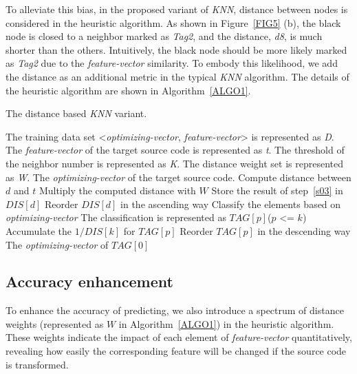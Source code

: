 \documentclass[bst/sn-mathphys]{sn-jnl}%
\theoremstyle{thmstyleone}%
\theoremstyle{thmstyletwo}%
\theoremstyle{thmstylethree}%
\begin{document}
To alleviate this bias, in the proposed variant of \emph{KNN}, distance 
between nodes is considered in the heuristic algorithm. As shown in 
Figure~\ref{FIG5} (b), the black node is closed to a neighbor marked as 
\emph{Tag2}, and the distance, \emph{d8}, is much shorter than the others. 
Intuitively, the black node should be more likely marked as \emph{Tag2} due to 
the \emph{feature-vector} similarity. To embody this likelihood, we add the 
distance as an additional metric in the typical \emph{KNN} algorithm. The 
details of the heuristic algorithm are shown in Algorithm~\ref{ALGO1}. 

\renewcommand{\algorithmicrequire}{\textbf{Input:}}
\renewcommand{\algorithmicensure}{\textbf{Output:}}

\begin{algorithm}
\caption{The distance based \emph{KNN} variant.}\label{ALGO1}
\begin{algorithmic}[1]
\Require
The training data set <\emph{optimizing-vector}, \emph{feature-vector}> is 
represented as \emph{D}. The \emph{feature-vector} of the target source code 
is represented as \emph{t}. The threshold of the neighbor number is 
represented as \emph{K}. The distance weight set is represented as \emph{W}.
\Ensure 
The \emph{optimizing-vector} of the target source code.
\State Compute distance between $d$ and $t$
\State Multiply the computed distance with $W$
\label{s03}
\State Store the result of step~\ref{s03} in $DIS[d]$
\EndFor
\State Reorder $DIS[d]$ in the ascending way
\State Classify the elements based on \emph{optimizing-vector}
\State The classification is represented as $TAG[p]$($p$ <= $k$)
\State Accumulate the $1/DIS[k]$ for $TAG[p]$
\EndFor
\State Reorder $TAG[p]$ in the descending way
\State
\Return The \emph{optimizing-vector} of $TAG[0]$
\end{algorithmic}
\end{algorithm}

\subsection{Accuracy enhancement}\label{sec0503}

To enhance the accuracy of predicting, we also introduce a spectrum of 
distance weights (represented as $W$ in Algorithm~\ref{ALGO1}) in the 
heuristic algorithm. These weights indicate the impact of each element of 
\emph{feature-vector} quantitatively, revealing how easily the corresponding 
feature will be changed if the source code is transformed.
\end{document}
